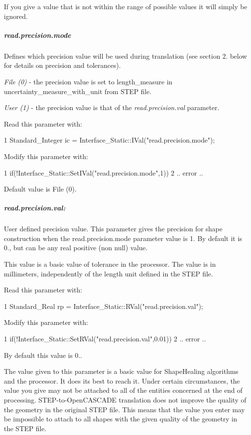 If you give a value that is not within the range of possible values it will simply be ignored.

\subparagraph*{read.\+precision.\+mode}

Defines which precision value will be used during translation (see section 2. below for details on precision and tolerances).
\begin{DoxyItemize}
\item {\itshape File (0)} -\/ the precision value is set to length\+\_\+measure in uncertainty\+\_\+measure\+\_\+with\+\_\+unit from S\+T\+EP file.
\item {\itshape User (1)} -\/ the precision value is that of the {\itshape read.\+precision.\+val} parameter.
\end{DoxyItemize}

Read this parameter with\+:


\begin{DoxyCode}
1 Standard\_Integer ic = Interface\_Static::IVal("read.precision.mode");  
\end{DoxyCode}
 Modify this parameter with\+: 
\begin{DoxyCode}
1 if(!Interface\_Static::SetIVal("read.precision.mode",1))  
2 .. error .. 
\end{DoxyCode}
 Default value is File (0).

\subparagraph*{read.\+precision.\+val\+:}

User defined precision value. This parameter gives the precision for shape construction when the read.\+precision.\+mode parameter value is 1. By default it is 0., but can be any real positive (non null) value.

This value is a basic value of tolerance in the processor. The value is in millimeters, independently of the length unit defined in the S\+T\+EP file.

Read this parameter with\+: 
\begin{DoxyCode}
1 Standard\_Real rp = Interface\_Static::RVal("read.precision.val"); 
\end{DoxyCode}
 Modify this parameter with\+: 
\begin{DoxyCode}
1 if(!Interface\_Static::SetRVal("read.precision.val",0.01))  
2 .. error .. 
\end{DoxyCode}
 By default this value is 0..

The value given to this parameter is a basic value for Shape\+Healing algorithms and the processor. It does its best to reach it. Under certain circumstances, the value you give may not be attached to all of the entities concerned at the end of processing. S\+T\+E\+P-\/to-\/\+Open\+C\+A\+S\+C\+A\+DE translation does not improve the quality of the geometry in the original S\+T\+EP file. This means that the value you enter may be impossible to attach to all shapes with the given quality of the geometry in the S\+T\+EP file.

